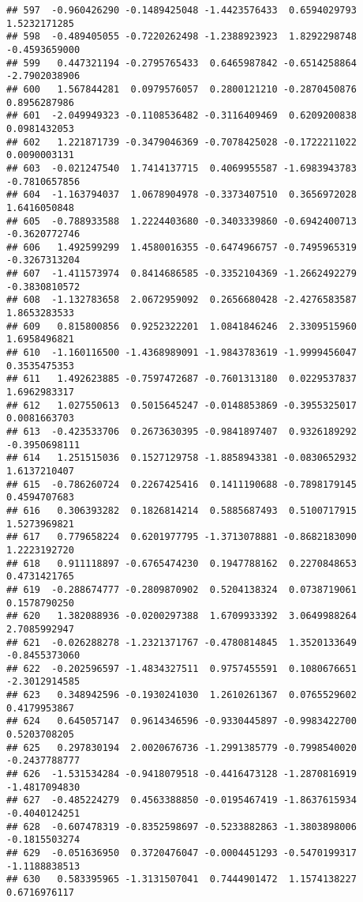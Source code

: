 \documentclass[
]{article}
\begin{document}
\begin{verbatim}
## 597  -0.960426290 -0.1489425048 -1.4423576433  0.6594029793  1.5232171285
## 598  -0.489405055 -0.7220262498 -1.2388923923  1.8292298748 -0.4593659000
## 599   0.447321194 -0.2795765433  0.6465987842 -0.6514258864 -2.7902038906
## 600   1.567844281  0.0979576057  0.2800121210 -0.2870450876  0.8956287986
## 601  -2.049949323 -0.1108536482 -0.3116409469  0.6209200838  0.0981432053
## 602   1.221871739 -0.3479046369 -0.7078425028 -0.1722211022  0.0090003131
## 603  -0.021247540  1.7414137715  0.4069955587 -1.6983943783 -0.7810657856
## 604  -1.163794037  1.0678904978 -0.3373407510  0.3656972028  1.6416050848
## 605  -0.788933588  1.2224403680 -0.3403339860 -0.6942400713 -0.3620772746
## 606   1.492599299  1.4580016355 -0.6474966757 -0.7495965319 -0.3267313204
## 607  -1.411573974  0.8414686585 -0.3352104369 -1.2662492279 -0.3830810572
## 608  -1.132783658  2.0672959092  0.2656680428 -2.4276583587  1.8653283533
## 609   0.815800856  0.9252322201  1.0841846246  2.3309515960  1.6958496821
## 610  -1.160116500 -1.4368989091 -1.9843783619 -1.9999456047  0.3535475353
## 611   1.492623885 -0.7597472687 -0.7601313180  0.0229537837  1.6962983317
## 612   1.027550613  0.5015645247 -0.0148853869 -0.3955325017  0.0081663703
## 613  -0.423533706  0.2673630395 -0.9841897407  0.9326189292 -0.3950698111
## 614   1.251515036  0.1527129758 -1.8858943381 -0.0830652932  1.6137210407
## 615  -0.786260724  0.2267425416  0.1411190688 -0.7898179145  0.4594707683
## 616   0.306393282  0.1826814214  0.5885687493  0.5100717915  1.5273969821
## 617   0.779658224  0.6201977795 -1.3713078881 -0.8682183090  1.2223192720
## 618   0.911118897 -0.6765474230  0.1947788162  0.2270848653  0.4731421765
## 619  -0.288674777 -0.2809870902  0.5204138324  0.0738719061  0.1578790250
## 620   1.382088936 -0.0200297388  1.6709933392  3.0649988264  2.7085992947
## 621  -0.026288278 -1.2321371767 -0.4780814845  1.3520133649 -0.8455373060
## 622  -0.202596597 -1.4834327511  0.9757455591  0.1080676651 -2.3012914585
## 623   0.348942596 -0.1930241030  1.2610261367  0.0765529602  0.4179953867
## 624   0.645057147  0.9614346596 -0.9330445897 -0.9983422700  0.5203708205
## 625   0.297830194  2.0020676736 -1.2991385779 -0.7998540020 -0.2437788777
## 626  -1.531534284 -0.9418079518 -0.4416473128 -1.2870816919 -1.4817094830
## 627  -0.485224279  0.4563388850 -0.0195467419 -1.8637615934 -0.4040124251
## 628  -0.607478319 -0.8352598697 -0.5233882863 -1.3803898006 -0.1815503274
## 629  -0.051636950  0.3720476047 -0.0004451293 -0.5470199317 -1.1188838513
## 630   0.583395965 -1.3131507041  0.7444901472  1.1574138227  0.6716976117

\end{verbatim}
\end{document}

